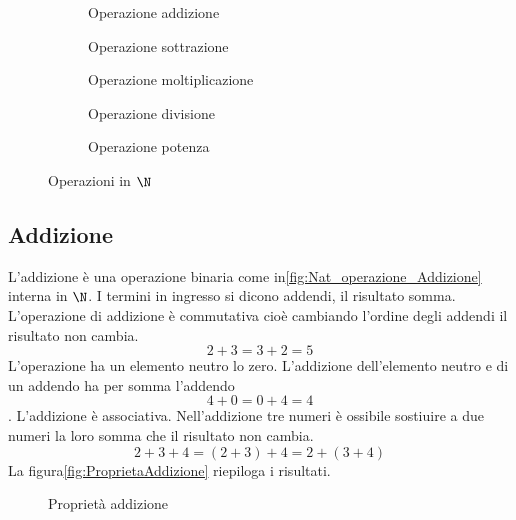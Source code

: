 \begin{figure} 

	\begin{subfigure}[b]{.5\linewidth}
		\centering

	\caption{Operazione addizione}
	\label{fig:Nat_operazione_Addizione}
	\end{subfigure}%
	\begin{subfigure}[b]{.5\linewidth}
	\centering

	\caption{Operazione sottrazione}
	\label{fig:Nat_operazione_Sottrazione}
	\end{subfigure}
	\begin{subfigure}[b]{.5\linewidth}
	\centering

	\caption{Operazione moltiplicazione}
	\label{fig:Nat_operazione_Moltiplicazione}
	\end{subfigure}
	\begin{subfigure}[b]{.5\linewidth}
	\centering

	\caption{Operazione divisione}
	\label{fig:Nat_operazione_Divisione}
	\end{subfigure}
		\begin{subfigure}[b]{.5\linewidth}
		\centering
	
		\caption{Operazione potenza}
		\label{fig:Nat_operazione_Potenza}
		\end{subfigure}
	\caption{Operazioni in $\N$}
	\label{fig:OperazioniinN}
\end{figure}
\subsection{Addizione}
\label{sec:NumerinatADD}
L'addizione è una operazione binaria come in\nobs\vref{fig:Nat_operazione_Addizione}  interna in $\N$. I termini in ingresso si dicono addendi, il risultato somma. L'operazione di  addizione è commutativa cioè cambiando l'ordine degli addendi il risultato non cambia. \[2+3=3+2=5\] L'operazione ha un elemento neutro lo zero. L'addizione dell'elemento neutro e di un addendo ha per somma l'addendo  \[4+0=0+4=4\]. L'addizione è associativa. Nell'addizione tre numeri è ossibile sostiuire a due numeri la loro somma che il risultato non  cambia.\[2+3+4=(2+3)+4=2+(3+4)\] La figura\nobs\vref{fig:ProprietaAddizione} riepiloga i risultati.
\begin{figure} %
	\centering

	\caption{Proprietà addizione}
	\label{fig:ProprietaAddizione}\end{figure}
